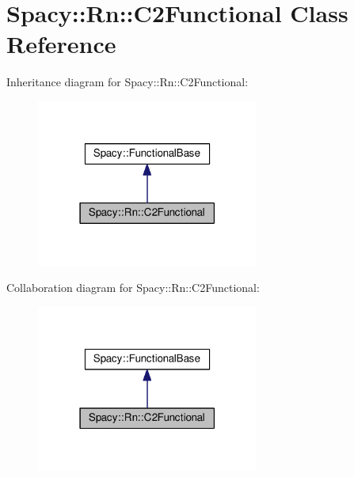 \hypertarget{classSpacy_1_1Rn_1_1C2Functional}{}\section{Spacy\+:\+:Rn\+:\+:C2\+Functional Class Reference}
\label{classSpacy_1_1Rn_1_1C2Functional}


Inheritance diagram for Spacy\+:\+:Rn\+:\+:C2\+Functional\+:
\nopagebreak
\begin{figure}[H]
\begin{center}
\leavevmode
\includegraphics[width=207pt]{classSpacy_1_1Rn_1_1C2Functional__inherit__graph}
\end{center}
\end{figure}


Collaboration diagram for Spacy\+:\+:Rn\+:\+:C2\+Functional\+:
\nopagebreak
\begin{figure}[H]
\begin{center}
\leavevmode
\includegraphics[width=207pt]{classSpacy_1_1Rn_1_1C2Functional__coll__graph}
\end{center}
\end{figure}
